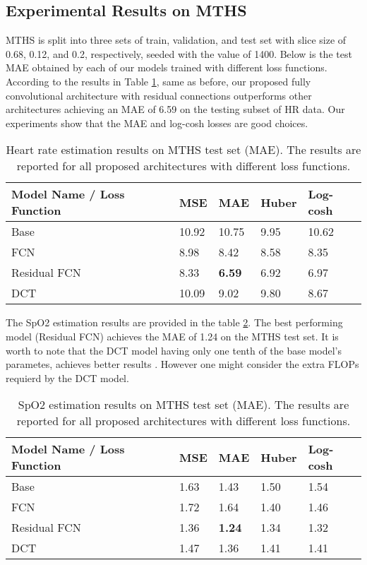 \documentclass[conference]{IEEEtran}
\begin{document}
\subsection{Experimental Results on MTHS}
MTHS is split into three sets of train, validation, and test set with slice size of 0.68, 0.12, and 0.2, respectively, seeded with the value of 1400. Below is the test MAE obtained by each of our models trained with different loss functions. According to the results in Table \ref{table:MTHS-MAE-hr}, same as before, our proposed fully convolutional architecture with residual connections outperforms other architectures achieving an MAE of 6.59 on the testing subset of HR data. Our experiments show that the MAE and log-cosh losses are good choices.


\begin{table}[htbp]
\caption{Heart rate estimation results on MTHS test set (MAE). The results are reported for all proposed architectures with different loss functions.}
\label{table:MTHS-MAE-hr}
\begin{tabular}{lllll}
\toprule
Model Name / Loss Function & MSE  & MAE  & Huber & Log-cosh \\ \hline
Base                     & 10.92 & 10.75  & 9.95  & 10.62     \\
FCN                      & 8.98 & 8.42  & 8.58  & 8.35     \\
Residual FCN             & 8.33 & \textbf{6.59} & 6.92  & 6.97     \\
DCT                     & 10.09 & 9.02 & 9.80  & 8.67    \\
\bottomrule
\end{tabular}
\end{table}

The SpO2 estimation results are provided in the table \ref{table:MTHS-MAE-spo2}. The best performing model (Residual FCN) achieves the MAE of 1.24 on the MTHS test set. It is worth to note that the DCT model having only one tenth of the base model's parametes, achieves better results . However one might consider the extra FLOPs requierd by the DCT model.

\begin{table}[htbp]
\caption{SpO2 estimation results on MTHS test set (MAE). The results are reported for all proposed architectures with different loss functions.}
\label{table:MTHS-MAE-spo2}
\begin{tabular}{lllll}
\toprule
Model Name / Loss Function & MSE  & MAE  & Huber & Log-cosh \\ \hline
Base                    & 1.63 & 1.43  & 1.50  & 1.54     \\
FCN                      & 1.72 & 1.64  & 1.40  & 1.46     \\
Residual FCN             & 1.36 & \textbf{1.24} & 1.34  & 1.32     \\
DCT                      & 1.47 & 1.36 & 1.41  & 1.41   \\
\bottomrule
\end{tabular}
\end{table}
\end{document}
